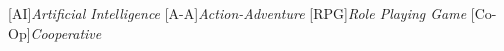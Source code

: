 [AI]{\emph{Artificial Intelligence}}
[A-A]{\emph{Action-Adventure}}
[RPG]{\emph{Role Playing Game}}
[Co-Op]{\emph{Cooperative}}